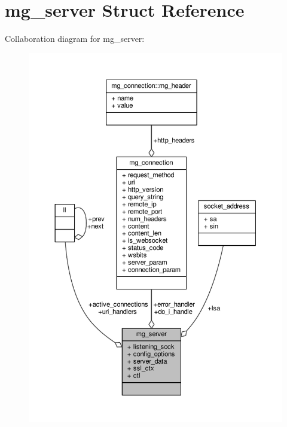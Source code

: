 \hypertarget{structmg__server}{}\section{mg\+\_\+server Struct Reference}
\label{structmg__server}


Collaboration diagram for mg\+\_\+server\+:
\nopagebreak
\begin{figure}[H]
\begin{center}
\leavevmode
\includegraphics[width=350pt]{d7/d4d/structmg__server__coll__graph}
\end{center}
\end{figure}
